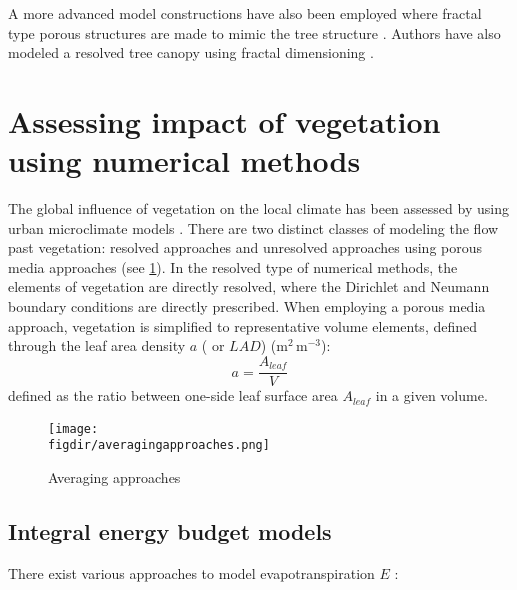 A more advanced model constructions have also been employed where fractal type porous structures are made to mimic the tree structure \citep{McClure2017}. Authors have also modeled a resolved tree canopy using fractal dimensioning \citep{Bai2012,Bai2014a}. 

\section{Assessing impact of vegetation using numerical methods}

The global influence of vegetation on the local climate has been assessed by using urban microclimate models \citep{Bruse1998, Robitu2006}. There are two distinct classes of modeling the flow past vegetation: resolved approaches \citep{Endalew2009,Endalew2006} and unresolved approaches using porous media approaches \citep{Sanz2003, Kenjeres2013, Gromke2014, Katul2004} (see \cref{fig:averagingapproaches}). In the resolved type of numerical methods, the elements of vegetation are directly resolved, where the Dirichlet and Neumann boundary conditions are directly prescribed. When employing a porous media approach, vegetation is simplified to representative volume elements, defined through the leaf area density $a$ ( or $\textit{LAD}$) (m$^2$\,m$^{-3}$):
\begin{equation}
a = \frac{A_{\textit{leaf}}}{V}
\end{equation}
defined as the ratio between one-side leaf surface area $A_{\textit{leaf}}$ in a given volume. 

	\begin{figure}[h]
		\centering
		\texttt{[image: \\figdir/averagingapproaches.png]}
		\caption{Averaging approaches}
		\label{fig:averagingapproaches}
	\end{figure}	

\subsection{Integral energy budget models}

There exist various approaches to model evapotranspiration $E$ \citep{abtew2012evaporation}: 

